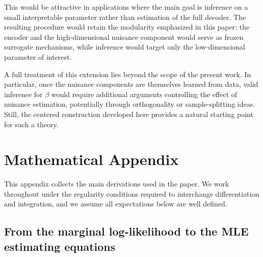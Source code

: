 \documentclass[twoside,11pt]{article}
\begin{document}
This would be attractive in applications where the main goal is inference on a small interpretable parameter rather than estimation of the full decoder. The resulting procedure would retain the modularity emphasized in this paper: the encoder and the high-dimensional nuisance component would serve as frozen surrogate mechanisms, while inference would target only the low-dimensional parameter of interest.

A full treatment of this extension lies beyond the scope of the present work. In particular, once the nuisance components are themselves learned from data, valid inference for \(\beta\) would require additional arguments controlling the effect of nuisance estimation, potentially through orthogonality or sample-splitting ideas. Still, the centered construction developed here provides a natural starting point for such a theory.



\newpage
 
\newpage
\appendix

\section{Mathematical Appendix}
\label{appendix:theory}

This appendix collects the main derivations used in the paper. We work throughout under the regularity conditions required to interchange differentiation and integration, and we assume all expectations below are well defined.

\subsection{From the marginal log-likelihood to the MLE estimating equations}
\label{apx:mle-estimating-equations}
\end{document}
